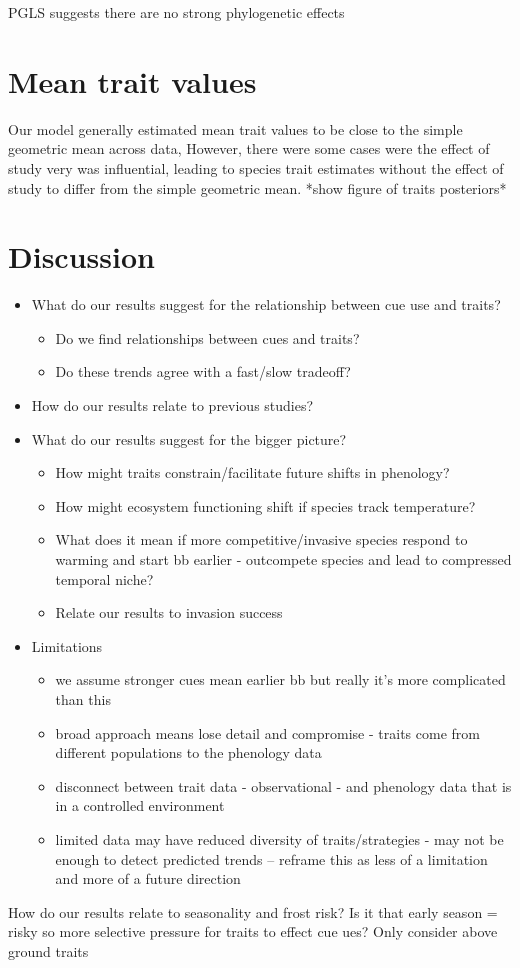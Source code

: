 \documentclass{article}\usepackage[]{graphicx}\usepackage[]{color}
\begin{document}
PGLS suggests there are no strong phylogenetic effects

\section{Mean trait values}
Our model generally estimated mean trait values to be close to the simple geometric mean across data, However, there were some cases were the effect of study very was influential, leading to species trait estimates without the effect of study to differ from the simple geometric mean. *show figure of traits posteriors*  
 
\section{Discussion}

\begin{itemize}
\item What do our results suggest for the relationship between cue use and traits?
	\begin{itemize}
	\item Do we find relationships between cues and traits?
	\item Do these trends agree with a fast/slow tradeoff?
	\end{itemize}
\item How do our results relate to previous studies? 
\item What do our results suggest for the bigger picture?
	\begin{itemize}
	\item How might traits constrain/facilitate future shifts in phenology?
	\item How might ecosystem functioning shift if species track temperature?
	\item What does it mean if more competitive/invasive species respond to warming and start bb earlier - outcompete species and lead to compressed temporal niche?
	\item Relate our results to invasion success 
	\end{itemize}

\item Limitations
	\begin{itemize}
	\item we assume stronger cues mean earlier bb but really it's more complicated than this
	\item broad approach means lose detail and compromise - traits come from different populations to the phenology data
	\item disconnect between trait data - observational - and phenology data that is in a controlled environment
	\item limited data may have reduced diversity of traits/strategies - may not be enough to detect predicted trends -- reframe this as less of a limitation and more of a future direction
	\end{itemize}
\end{itemize}
How do our results relate to seasonality and frost risk? Is it that early season = risky so more selective pressure for traits to effect cue ues?
Only consider above ground traits

\pagebreak
% 

\end{document}

